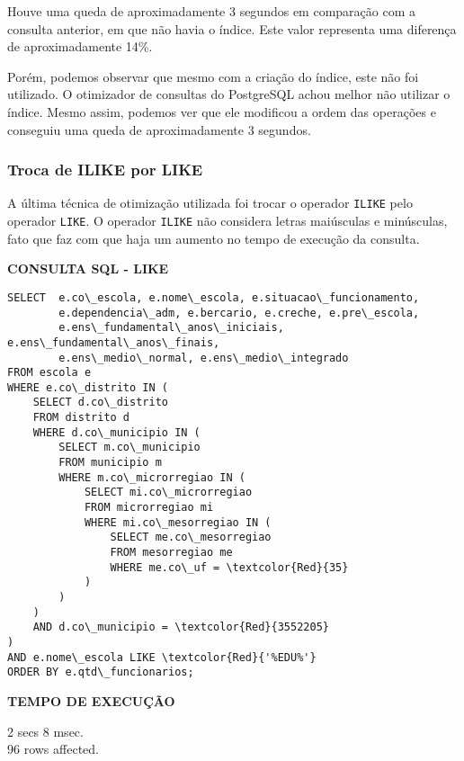 \documentclass[12pt,a4paper]{article}
\begin{document}
Houve uma queda de aproximadamente 3 segundos em comparação com a consulta anterior, em que não havia o índice. Este valor representa uma diferença de aproximadamente 14\%.

Porém, podemos observar que mesmo com a criação do índice, este não foi utilizado. O otimizador de consultas do PostgreSQL achou melhor não utilizar o índice. Mesmo assim, podemos ver que ele modificou a ordem das operações e conseguiu uma queda de aproximadamente 3 segundos.

\subsubsection{Troca de ILIKE por LIKE}

A última técnica de  otimização utilizada foi trocar o operador \texttt{ILIKE} pelo operador \texttt{LIKE}. O operador \texttt{ILIKE} não considera letras maiúsculas e minúsculas, fato que faz com que haja um aumento no tempo de execução da consulta. 

\vspace{0.5cm}
\begin{flushleft}
\textbf{CONSULTA SQL - LIKE}\\
\end{flushleft}

\begin{Verbatim}[commandchars=\\\{\}]
SELECT  e.co\_escola, e.nome\_escola, e.situacao\_funcionamento, 
        e.dependencia\_adm, e.bercario, e.creche, e.pre\_escola,
        e.ens\_fundamental\_anos\_iniciais, e.ens\_fundamental\_anos\_finais,
        e.ens\_medio\_normal, e.ens\_medio\_integrado
FROM escola e
WHERE e.co\_distrito IN (
    SELECT d.co\_distrito
    FROM distrito d
    WHERE d.co\_municipio IN (
        SELECT m.co\_municipio
        FROM municipio m
        WHERE m.co\_microrregiao IN (
            SELECT mi.co\_microrregiao
            FROM microrregiao mi
            WHERE mi.co\_mesorregiao IN (
                SELECT me.co\_mesorregiao
                FROM mesorregiao me
                WHERE me.co\_uf = \textcolor{Red}{35}
            )
        )
    )
    AND d.co\_municipio = \textcolor{Red}{3552205}
)
AND e.nome\_escola LIKE \textcolor{Red}{'%EDU%'}
ORDER BY e.qtd\_funcionarios;
\end{Verbatim}

\begin{flushleft}
\textbf{TEMPO DE EXECUÇÃO}\\
\end{flushleft}
2 secs 8 msec.\\
96 rows affected.\\
\end{document}
